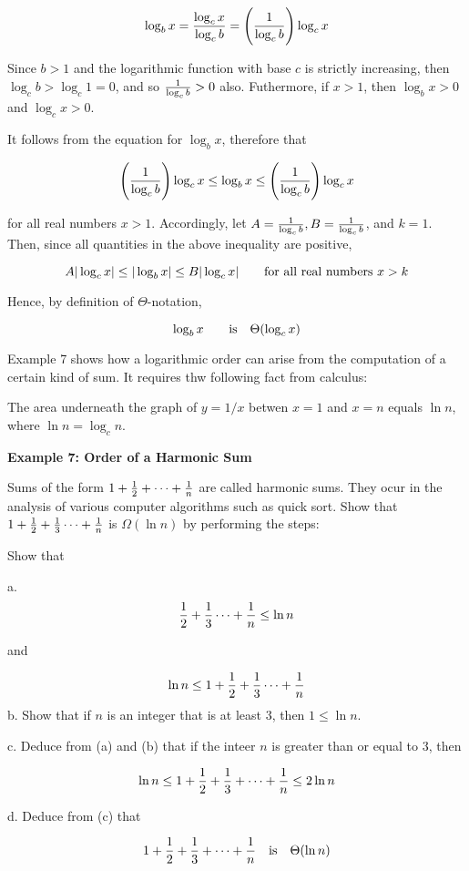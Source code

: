 $$\log_bx={\log_cx\over\log_cb}=\Biggl({1\over\log_c b}\Biggr)\log_cx$$

Since $b>1$ and the logarithmic function with base $c$ is strictly increasing, then $\log_cb>\log_c1=0$, and so ${1\over\log_cb}>0$ also. Futhermore, if $x>1$, then $\log_bx>0$ and $\log_cx>0$.
\vskip 1mm

It follows from the equation for $\log_bx$, therefore that

$$\Biggl({1\over\log_cb}\Biggr)\log_cx\leq\log_bx\leq\Biggl({1\over\log_cb}\Biggr)\log_cx$$

for all real numbers $x>1$. Accordingly, let $A={1\over\log_cb}, B={1\over\log_cb}$, and $k=1$. Then, since all quantities in the above inequality are positive,

$$A|\log_cx|\leq|\log_bx|\leq B|\log_cx|\qquad\hbox{for all real numbers $x>k$}$$

Hence, by definition of $\Theta$-notation,

$$\log_bx\qquad\hbox{is}\quad\Theta(\log_cx)$$

\filbreak
\vskip 1cm
Example 7 shows how a logarithmic order can arise from the computation of a certain kind of sum. It requires thw following fact from calculus:

The area underneath the graph of $y=1/x$ betwen $x=1$ and $x=n$ equals $\ln n$, where $\ln n=\log_cn$.

\vskip 1cm
{\bf Example 7: Order of a Harmonic Sum}

\vskip 3mm
Sums of the form $1+{1\over 2}+\cdots+{1\over n}$ are called harmonic sums. They ocur in the analysis of various computer algorithms such as quick sort. Show that $1+{1\over 2}+{1\over 3}\cdots+{1\over n}$ is $\Omega(\ln n)$ by performing the steps:

\vskip 1mm
Show that 

\vskip 1mm

a. $${1\over 2}+{1\over 3}\cdots+{1\over n}\leq\ln n$$

and

$$\ln n\leq 1+{1\over 2}+{1\over 3}\cdots+{1\over n}$$
b. Show that if $n$ is an integer that is at least $3$, then $1\leq \ln n$.

\vskip 3mm
c. Deduce from (a) and (b) that if the inteer $n$ is greater than or equal to $3$, then

$$\ln n\leq 1+{1\over 2}+{1\over 3}+\cdots+{1\over n}\leq2\ln n$$

\vskip 3mm
d. Deduce from (c) that

$$1+{1\over 2}+{1\over 3}+\cdots+{1\over n}\quad\hbox{is}\quad\Theta(\ln n)$$

